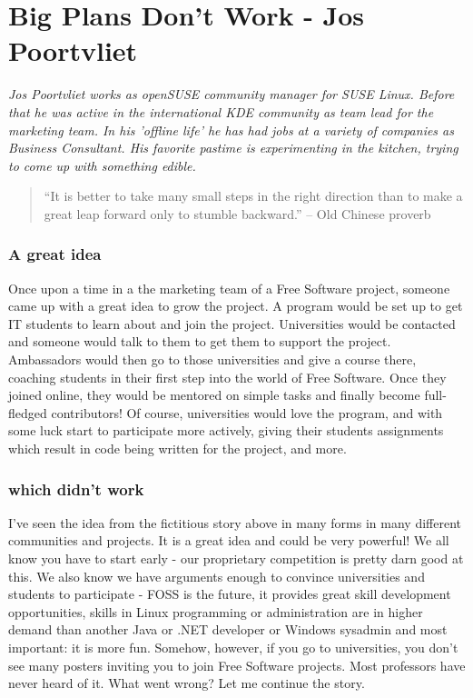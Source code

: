 \chapter{Big Plans Don't Work - Jos Poortvliet}

\textit{Jos Poortvliet works as openSUSE community manager for SUSE Linux. Before that he was active in the international KDE community as team lead for the marketing team. In his 'offline life' he has had jobs at a variety of companies as Business Consultant. His favorite pastime is experimenting in the kitchen, trying to come up with something edible.}

\begin{quote}``It is better to take many small steps in the right direction than to make a great leap forward only to stumble backward.'' -- Old Chinese proverb\end{quote}

\subsection*{A great idea}
Once upon a time in a the marketing team of a Free Software project, someone came up with a great idea to grow the project. A program would be set up to get IT students to learn about and join the project. Universities would be contacted and someone would talk to them to get them to support the project. Ambassadors would then go to those universities and give a course there, coaching students in their first step into the world of Free Software. Once they joined online, they would be mentored on simple tasks and finally become full-fledged contributors! Of course, universities would love the program, and with some luck start to participate more actively, giving their students assignments which result in code being written for the project, and more.

\subsection*{which didn't work}
I've seen the idea from the fictitious story above in many forms in many different communities and projects. It is a great idea and could be very powerful! We all know you have to start early - our proprietary competition is pretty darn good at this. We also know we have arguments enough to convince universities and students to participate - FOSS is the future, it provides great skill development opportunities, skills in Linux programming or administration are in higher demand than another Java or .NET developer or Windows sysadmin and most important: it is more fun. Somehow, however, if you go to universities, you don't see many posters inviting you to join Free Software projects. Most professors have never heard of it. What went wrong? Let me continue the story.

